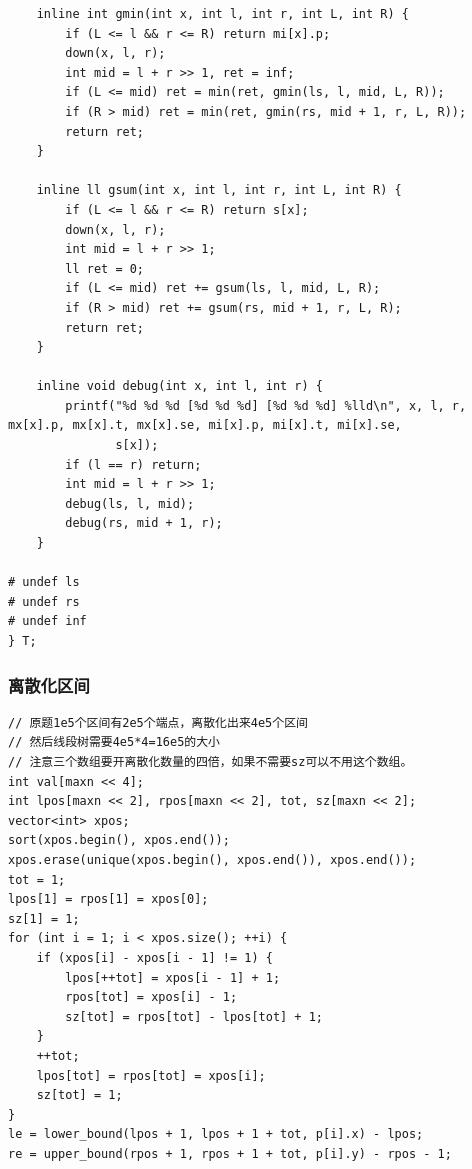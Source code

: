 \documentclass[twoside]{article}
\begin{document}
\begin{lstlisting}
    inline int gmin(int x, int l, int r, int L, int R) {
        if (L <= l && r <= R) return mi[x].p;
        down(x, l, r);
        int mid = l + r >> 1, ret = inf;
        if (L <= mid) ret = min(ret, gmin(ls, l, mid, L, R));
        if (R > mid) ret = min(ret, gmin(rs, mid + 1, r, L, R));
        return ret;
    }

    inline ll gsum(int x, int l, int r, int L, int R) {
        if (L <= l && r <= R) return s[x];
        down(x, l, r);
        int mid = l + r >> 1;
        ll ret = 0;
        if (L <= mid) ret += gsum(ls, l, mid, L, R);
        if (R > mid) ret += gsum(rs, mid + 1, r, L, R);
        return ret;
    }

    inline void debug(int x, int l, int r) {
        printf("%d %d %d [%d %d %d] [%d %d %d] %lld\n", x, l, r, mx[x].p, mx[x].t, mx[x].se, mi[x].p, mi[x].t, mi[x].se,
               s[x]);
        if (l == r) return;
        int mid = l + r >> 1;
        debug(ls, l, mid);
        debug(rs, mid + 1, r);
    }

# undef ls
# undef rs
# undef inf
} T;\end{lstlisting}
\subsubsection{离散化区间}
\begin{lstlisting}
// 原题1e5个区间有2e5个端点，离散化出来4e5个区间
// 然后线段树需要4e5*4=16e5的大小
// 注意三个数组要开离散化数量的四倍，如果不需要sz可以不用这个数组。
int val[maxn << 4];
int lpos[maxn << 2], rpos[maxn << 2], tot, sz[maxn << 2];
vector<int> xpos;
sort(xpos.begin(), xpos.end());
xpos.erase(unique(xpos.begin(), xpos.end()), xpos.end());
tot = 1;
lpos[1] = rpos[1] = xpos[0];
sz[1] = 1;
for (int i = 1; i < xpos.size(); ++i) {
    if (xpos[i] - xpos[i - 1] != 1) {
        lpos[++tot] = xpos[i - 1] + 1;
        rpos[tot] = xpos[i] - 1;
        sz[tot] = rpos[tot] - lpos[tot] + 1;
    }
    ++tot;
    lpos[tot] = rpos[tot] = xpos[i];
    sz[tot] = 1;
}
le = lower_bound(lpos + 1, lpos + 1 + tot, p[i].x) - lpos;
re = upper_bound(rpos + 1, rpos + 1 + tot, p[i].y) - rpos - 1;\end{lstlisting}
\end{document}
